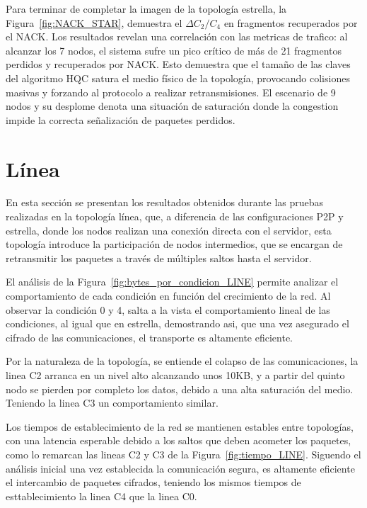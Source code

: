 Para terminar de completar la imagen de la topología estrella, la Figura~\ref{fig:NACK_STAR}, demuestra el $\Delta C_2/C_4$ en fragmentos recuperados
por el NACK. Los resultados revelan una correlación con las metricas de trafico: al alcanzar los 7 nodos, el sistema sufre un pico crítico de más de 
21 fragmentos perdidos y recuperados por NACK. Esto demuestra que el tamaño de las claves del algoritmo HQC satura el medio físico de la topología, 
provocando colisiones masivas y forzando al protocolo a realizar retransmisiones. El escenario de 9 nodos y su desplome denota una situación de saturación 
donde la congestion impide la correcta señalización de paquetes perdidos.

\section{Línea}

En esta sección se presentan los resultados obtenidos durante las pruebas realizadas en la topología línea, que, a diferencia de las configuraciones
P2P y estrella, donde los nodos realizan una conexión directa con el servidor, esta topología introduce la participación de nodos intermedios, que se
encargan de retransmitir los paquetes a través de múltiples saltos hasta el servidor. 

El análisis de la Figura~\ref{fig:bytes_por_condicion_LINE} permite analizar el comportamiento de cada condición en función del crecimiento de la red. 
Al observar la condición 0 y 4, salta a la vista el comportamiento lineal de las condiciones, al igual que en estrella, demostrando asi, que una vez
asegurado el cifrado de las comunicaciones, el transporte es altamente eficiente. 

Por la naturaleza de la topología, se entiende el colapso de las comunicaciones, la linea C2 arranca en un nivel alto alcanzando unos 10KB, y a partir del 
quinto nodo se pierden por completo los datos, debido a una alta saturación del medio. Teniendo la linea C3 un comportamiento similar.

Los tiempos de establecimiento de la red se mantienen estables entre topologías, con una latencia esperable debido a los saltos 
que deben acometer los paquetes, como lo remarcan las lineas C2 y C3 de la Figura~\ref{fig:tiempo_LINE}. Siguendo el análisis inicial 
una vez establecida la comunicación segura, es altamente eficiente el intercambio de paquetes cifrados, teniendo los mismos tiempos 
de esttablecimiento la linea C4 que la linea C0.


